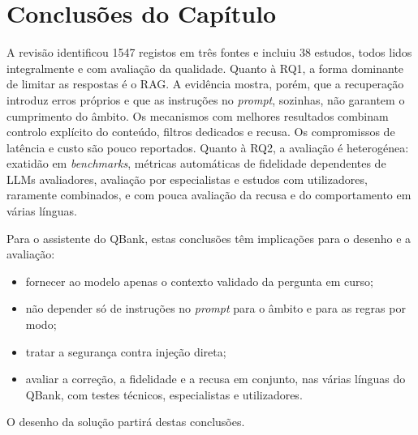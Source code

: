 \section{Conclusões do Capítulo}
\label{sec:chap2_conclusions}

A revisão identificou 1547 registos em três fontes e incluiu 38 estudos, todos lidos integralmente e com avaliação da qualidade. Quanto à RQ1, a forma dominante de limitar as respostas é o \gls{RAG}. A evidência mostra, porém, que a recuperação introduz erros próprios e que as instruções no \emph{prompt}, sozinhas, não garantem o cumprimento do âmbito. Os mecanismos com melhores resultados combinam controlo explícito do conteúdo, filtros dedicados e recusa. Os compromissos de latência e custo são pouco reportados. Quanto à RQ2, a avaliação é heterogénea: exatidão em \emph{benchmarks}, métricas automáticas de fidelidade dependentes de \glspl{LLM} avaliadores, avaliação por especialistas e estudos com utilizadores, raramente combinados, e com pouca avaliação da recusa e do comportamento em várias línguas.

Para o assistente do QBank, estas conclusões têm implicações para o desenho e a avaliação:
\begin{itemize}
    \item fornecer ao modelo apenas o contexto validado da pergunta em curso;
    \item não depender só de instruções no \emph{prompt} para o âmbito e para as regras por modo;
    \item tratar a segurança contra injeção direta;
    \item avaliar a correção, a fidelidade e a recusa em conjunto, nas várias línguas do QBank, com testes técnicos, especialistas e utilizadores.
\end{itemize} O desenho da solução partirá destas conclusões.
